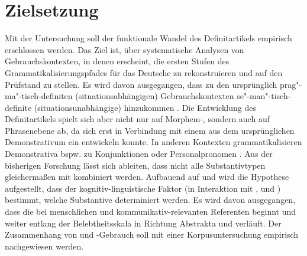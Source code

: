 \section{Zielsetzung} 

Mit der Untersuchung soll der funktionale Wandel des Definitartikels  empirisch erschlossen werden. Das Ziel ist, über systematische Analysen von Gebrauchskontexten, in denen  erscheint, die ersten Stufen des Grammatikalisierungspfades  \parencite{Lehmann2015} für das Deutsche zu rekonstruieren und auf den Prüfstand zu stellen. Es wird davon ausgegangen, dass zu den ursprünglich prag"-ma"-tisch-definiten (situationsabhängigen) Gebrauchskontexten 
 se"-man"-tisch-definite (situationsunabhängige)  hinzukommen \parencite{Lobner1985,Himmelmann1997}. 
Die Entwicklung des Definitartikels spielt sich aber nicht nur auf  Morphem-,  sondern auch auf Phrasenebene  ab, da sich erst in Verbindung mit einem  aus dem ursprünglichen Demonstrativum  ein  entwickeln konnte. In anderen Kontexten grammatikalisieren Demonstrativa  bspw. zu Konjunktionen  oder Personalpronomen  \parencite{Diessel1999}. Aus der bisherigen Forschung \parencite[u.a.][]{Oubouzar1989,Oubouzar1992}
lässt sich ableiten, dass nicht alle Substantivtypen  gleichermaßen mit  kombiniert werden. Aufbauend auf \textcite{Szczepaniak2011a} und \textcite{Enger2011} wird die Hypothese aufgestellt, dass der kognitiv-linguistische Faktor  (in Interaktion mit ,  und ) bestimmt, welche Substantive  determiniert werden. Es wird davon ausgegangen, dass die  bei menschlichen und kommunikativ-relevanten Referenten beginnt und weiter entlang der Belebtheitsskala  in Richtung Abstrakta  und  verläuft. Der Zusammenhang von  und -Gebrauch soll mit einer Korpusuntersuchung  empirisch nachgewiesen werden.  

